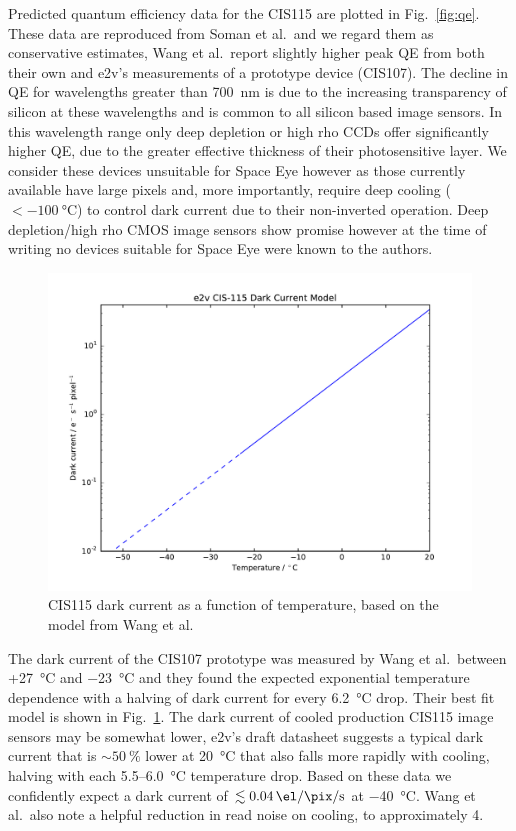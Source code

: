 \documentclass[]{iac}
\begin{document}
Predicted quantum efficiency data for the CIS115 are plotted in Fig.~\ref{fig:qe}. These data are reproduced from Soman
et al.\cite{Soman2014}\ and we regard them as conservative estimates, Wang et al.\cite{Wang2014}\ report slightly higher
peak QE from both their own and e2v's measurements of a prototype device (CIS107). The decline in QE for wavelengths
greater than \SI{700}{\nano\metre} is due to the increasing transparency of silicon at these wavelengths and is common
to all silicon based image sensors. In this wavelength range only deep depletion or high rho CCDs offer significantly
higher QE, due to the greater effective thickness of their photosensitive layer. We consider these devices unsuitable
for Space Eye however as those currently available have large pixels and, more importantly, require deep cooling
($<\SI{-100}{\celsius}$) to control dark current due to their non-inverted operation. Deep depletion/high rho CMOS image
sensors show promise however at the time of writing no devices suitable for Space Eye were known to the authors.

\begin{figure}[htp]
  \center \includegraphics[width=\columnwidth]{figures/CIS115DC.pdf}
  \caption{\label{fig:dc}CIS115 dark current as a function of temperature, based on the model from Wang et al.
    \cite{Wang2014}}
\end{figure}

The dark current of the CIS107 prototype was measured by Wang et al.\ between +\SI{27}{\celsius} and \SI{-23}{\celsius}
and they found the expected exponential temperature dependence with a halving of dark current for every
\SI{6.2}{\celsius} drop. Their best fit model is shown in Fig.~\ref{fig:dc}. The dark current of cooled production
CIS115 image sensors may be somewhat lower, e2v's draft datasheet suggests a typical dark current that is
$\sim\SI{50}{\percent}$ lower at \SI{20}{\celsius} that also falls more rapidly with cooling, halving with each
5.5--\SI{6.0}{\celsius} temperature drop. Based on these data we confidently expect a dark current of
$\lesssim\SI{0.04}{\el\per\pix\per\second}$ at \SI{-40}{\celsius}. Wang et al.\ also note a helpful reduction in read
noise on cooling, to approximately \SI{4}{\el}.
\end{document}
